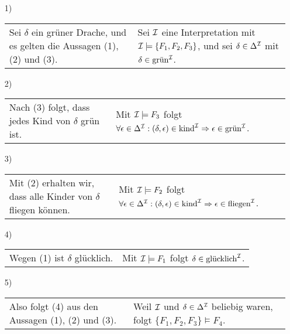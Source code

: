\begin{enumerate}
\item[1)]
\begin{tabular}[t]{p{} p{}}
Sei $\delta$ ein grüner Drache, und es gelten die Aussagen (1), (2) und (3). & Sei $\mathcal{I}$ eine Interpretation mit \newline 
$\mathcal{I} \models \{F_1, F_2, F_3 \}$, und sei $\delta \in \Delta^{\mathcal{I}}$ mit $\delta \in \text{grün}^{\mathcal{I}}$. 
\end{tabular}
\item[2)] 
\begin{tabular}[t]{p{} p{}}
Nach (3) folgt, dass jedes Kind von $\delta$ grün ist. & Mit $\mathcal{I} \models F_3$ folgt \newline 
$\forall \epsilon \in \Delta^{\mathcal{I}}: (\delta, \epsilon) \in \text{kind}^{\mathcal{I}} \Rightarrow \epsilon \in \text{grün}^{\mathcal{I}}$.
\end{tabular}
\item[3)] 
\begin{tabular}[t]{p{} p{}}
Mit (2) erhalten wir, dass alle Kinder von $\delta$ fliegen können. & Mit $\mathcal{I} \models F_2$ folgt \newline 
$\forall \epsilon \in \Delta^{\mathcal{I}}: (\delta, \epsilon) \in \text{kind}^{\mathcal{I}} \Rightarrow \epsilon \in \text{fliegen}^{\mathcal{I}}$.
\end{tabular}
\item[4)] 
\begin{tabular}[t]{p{} p{}}
Wegen (1) ist $\delta$ glücklich. & Mit $\mathcal{I} \models F_1$ folgt $\delta \in \text{glücklich}^{\mathcal{I}}$.
\end{tabular}
\item[5)] 
\begin{tabular}[t]{p{} p{}}
Also folgt (4) aus den Aussagen (1), (2) und (3). & Weil $\mathcal{I}$ und $\delta \in \Delta^{\mathcal{I}}$ beliebig waren, folgt \newline 
$\{F_1, F_2, F_3\} \models F_4$. 
\end{tabular}
\end{enumerate}

